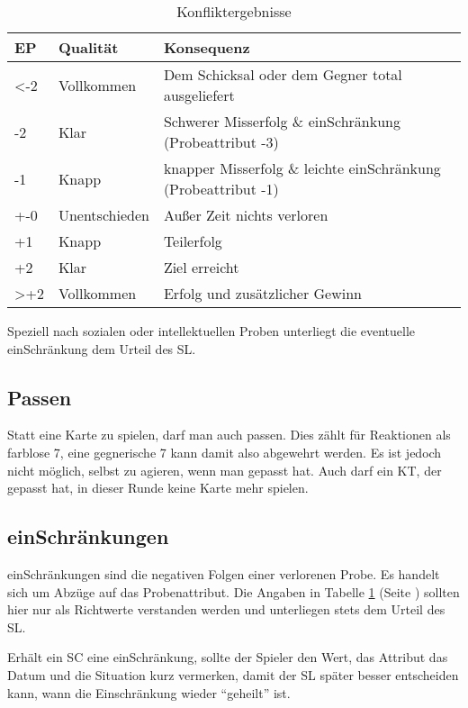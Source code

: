 \begin{table}[H]
\caption{Konfliktergebnisse}
\label{tab:konfliktergebnisse}
\begin{tabular}{|l|l|l|}
\hline
EP  & Qualität & Konsequenz \\
\hline
\textless -2 & Vollkommen & Dem Schicksal oder dem Gegner total ausgeliefert \\
-2  & Klar & Schwerer Misserfolg \& einSchränkung (Probeattribut -3) \\
-1 & Knapp & knapper Misserfolg \& leichte einSchränkung (Probeattribut -1) \\
+-0 & Unentschieden & Außer Zeit nichts verloren \\
+1 & Knapp & Teilerfolg \\
+2 & Klar & Ziel erreicht \\
\textgreater +2 & Vollkommen & Erfolg und zusätzlicher Gewinn \\
\hline
\end{tabular}

Speziell nach sozialen oder intellektuellen Proben unterliegt die eventuelle einSchränkung dem Urteil des SL.
\end{table}

\subsection {Passen}
\label {subsect:passen}
Statt eine Karte zu spielen, darf man auch passen. Dies zählt für Reaktionen als farblose 7, eine gegnerische 7 kann damit also abgewehrt werden. Es ist jedoch nicht möglich, selbst zu agieren, wenn man gepasst hat. Auch darf ein KT, der gepasst hat, in dieser Runde keine Karte mehr spielen.
\subsection {einSchränkungen}
einSchränkungen sind die negativen Folgen einer verlorenen Probe. Es handelt sich um Abzüge auf das Probenattribut. Die Angaben in Tabelle \ref {tab:konfliktergebnisse} (Seite \pageref {tab:konfliktergebnisse}) sollten hier nur als Richtwerte verstanden werden und unterliegen stets dem Urteil des SL.

Erhält ein SC eine einSchränkung, sollte der Spieler den Wert, das Attribut das Datum und die Situation kurz vermerken, damit der SL später besser entscheiden kann, wann die Einschränkung wieder "`geheilt"' ist.
